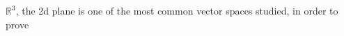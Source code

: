 \documentclass[preview]{standalone}
\begin{document}
\begin{center}
$\mathbb{R}^3$, the 2d plane is one of the most common vector spaces studied, in order to prove
\end{center}
\end{document}
